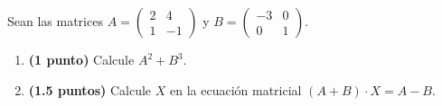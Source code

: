 
Sean las matrices
$A=\begin{pmatrix}2&4\\1&-1\end{pmatrix}$ y
$B=\begin{pmatrix}-3&0\\0&1\end{pmatrix}$.
\begin{enumerate}[label=\alph*)]
\item \textbf{(1 punto)} Calcule $A^2+B^3$.
\item \textbf{(1.5 puntos)} Calcule $X$ en la ecuación matricial $(A+B)\cdot X=A-B$.
\end{enumerate}
